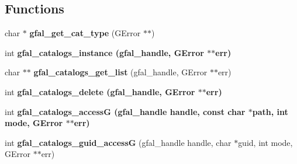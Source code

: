 \subsection*{Functions}
\begin{CompactItemize}
\item 
char $\ast$ \textbf{gfal\_\-get\_\-cat\_\-type} (GError $\ast$$\ast$)\label{gfal__common__catalog_8h_791ad55a9c8aaca0bb8ae74a3538c202}

\item 
int \bf{gfal\_\-catalogs\_\-instance} (gfal\_\-handle, GError $\ast$$\ast$err)
\item 
char $\ast$$\ast$ \textbf{gfal\_\-catalogs\_\-get\_\-list} (gfal\_\-handle, GError $\ast$$\ast$err)\label{gfal__common__catalog_8h_01278095d52a0e33643de8c084ccba76}

\item 
int \bf{gfal\_\-catalogs\_\-delete} (gfal\_\-handle, GError $\ast$$\ast$err)
\item 
int \bf{gfal\_\-catalogs\_\-access\-G} (gfal\_\-handle handle, const char $\ast$path, int mode, GError $\ast$$\ast$err)
\item 
int \textbf{gfal\_\-catalogs\_\-guid\_\-access\-G} (gfal\_\-handle handle, char $\ast$guid, int mode, GError $\ast$$\ast$err)\label{gfal__common__catalog_8h_fdd144370f8c6df2564eaddbf26e2fd5}


\end{CompactItemize}
